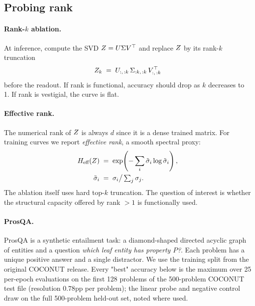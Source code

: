 \subsection{Probing rank}

\paragraph{Rank-$k$ ablation.} At inference, compute the SVD
$Z = U\Sigma V^\top$ and replace $Z$ by its rank-$k$ truncation
\[
Z_k \;=\; U_{:,\,:k}\,\Sigma_{:k,\,:k}\,V_{:,\,:k}^\top
\]
before the readout. If rank is functional, accuracy should drop
as $k$ decreases to 1. If rank is vestigial, the curve is flat.

\paragraph{Effective rank.} The numerical rank of $Z$ is always
$d$ since it is a dense trained matrix. For training curves we
report \emph{effective rank}, a smooth spectral proxy:
\begin{align*}
H_{\text{eff}}(Z) &\;=\; \exp\!\left(-\sum_i \tilde\sigma_i \log \tilde\sigma_i\right),\\
\tilde\sigma_i &\;=\; \sigma_i \big/ \textstyle\sum_j \sigma_j.
\end{align*}
The ablation itself uses hard top-$k$ truncation. The question of
interest is whether the structural capacity offered by rank $>1$
is functionally used.

\paragraph{ProsQA.} ProsQA \citep{hao2024coconut} is a synthetic
entailment task: a diamond-shaped directed acyclic graph of
entities and a question \emph{which leaf entity has property $P$?}.
Each problem has a unique positive answer and a single distractor.
We use the training split from the original COCONUT release. Every
"best" accuracy below is the maximum over 25 per-epoch evaluations on
the first 128 problems of the 500-problem COCONUT test file (resolution
$0.78$pp per problem); the linear probe and negative control draw on
the full 500-problem held-out set, noted where used.
